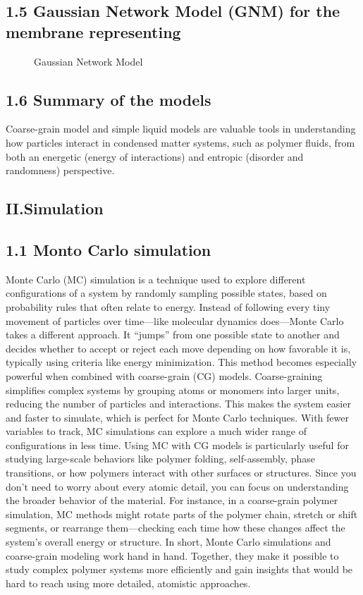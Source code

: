 \documentclass[12pt]{article}
\begin{document}
\begin{flushleft}
\subsection*{1.5 Gaussian Network Model (GNM) for the membrane representing }
\begin{figure}[!ht]
  \centering
  \caption{Gaussian Network Model}
\end{figure}





\subsection*{1.6 Summary of the models}
Coarse-grain model and simple liquid models are valuable tools in understanding how particles interact in condensed matter systems, such as polymer fluids, from both an energetic (energy of interactions) and entropic (disorder and randomness) perspective.


\subsection*{II.Simulation}


\subsection*{1.1 Monto Carlo simulation}

Monte Carlo (MC) simulation is a technique used to explore different configurations of a system by randomly sampling possible states, based on probability rules that often relate to energy. Instead of following every tiny movement of particles over time—like molecular dynamics does—Monte Carlo takes a different approach. It “jumps” from one possible state to another and decides whether to accept or reject each move depending on how favorable it is, typically using criteria like energy minimization.
This method becomes especially powerful when combined with coarse-grain (CG) models. Coarse-graining simplifies complex systems by grouping atoms or monomers into larger units, reducing the number of particles and interactions. This makes the system easier and faster to simulate, which is perfect for Monte Carlo techniques. With fewer variables to track, MC simulations can explore a much wider range of configurations in less time.
Using MC with CG models is particularly useful for studying large-scale behaviors like polymer folding, self-assembly, phase transitions, or how polymers interact with other surfaces or structures. Since you don’t need to worry about every atomic detail, you can focus on understanding the broader behavior of the material. For instance, in a coarse-grain polymer simulation, MC methods might rotate parts of the polymer chain, stretch or shift segments, or rearrange them—checking each time how these changes affect the system’s overall energy or structure.
In short, Monte Carlo simulations and coarse-grain modeling work hand in hand. Together, they make it possible to study complex polymer systems more efficiently and gain insights that would be hard to reach using more detailed, atomistic approaches.


\end{flushleft}
\end{document}
